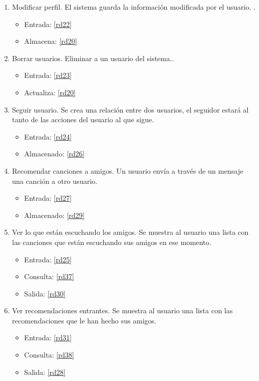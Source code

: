 \documentclass[12pt,a4paper]{article}
\begin{document}
\begin{enumerate}[label=\textnormal{RF\arabic*.}]
	 \item Modificar perfil. El sistema guarda la información modificada por el usuario. \label{rf14}.
    	\begin{itemize}
			\item Entrada: \ref{rd22}
			\item Almacena: \ref{rd20}
		\end{itemize}
		
	 \item Borrar usuarios. Eliminar a un usuario del sistema.\label{rf15}.
    	\begin{itemize}
			\item Entrada: \ref{rd23}
			\item Actualiza: \ref{rd20}
		\end{itemize}
		
		
	 \item Seguir usuario. Se crea una relación entre dos usuarios, el seguidor estará al tanto de las acciones del usuario al que sigue. \label{rf16}
	 	\begin{itemize}
			\item Entrada: \ref{rd24}
			\item Almacenado: \ref{rd26}
		\end{itemize}
	
	 \item Recomendar canciones a amigos. Un usuario envía a través de un mensaje una canción a otro usuario. \label{rf17}
	 	\begin{itemize}
			\item Entrada: \ref{rd27}
			\item Almacenado: \ref{rd29}
		\end{itemize}
	
	 \item Ver lo que están escuchando los amigos. Se muestra al usuario una lista con las canciones que están escuchando sus amigos en ese momento. \label{rf18}
	 	\begin{itemize}
			\item Entrada: \ref{rd25}
			\item Consulta: \ref{rd37}
			\item Salida: \ref{rd30}
		\end{itemize}

	 \item Ver recomendaciones entrantes. Se muestra al usuario una lista con las recomendaciones que le han hecho sus amigos. \label{rf19}
	 	\begin{itemize}
			\item Entrada: \ref{rd31}
			\item Consulta: \ref{rd38}
			\item Salida: \ref{rd28}
		\end{itemize}


\end{enumerate}
\end{document}
